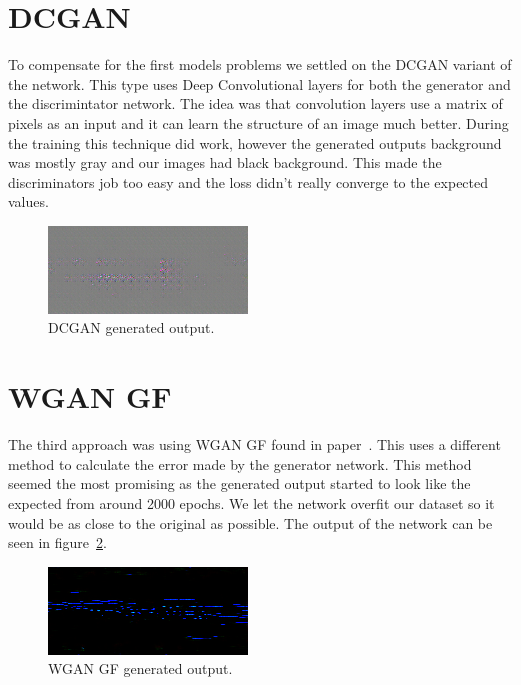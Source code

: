 \documentclass{article}
\begin{document}
\section{DCGAN}
To compensate for the first models problems we settled on the DCGAN variant of the network. This type uses Deep Convolutional layers for both the generator and the discrimintator network. The idea was that convolution layers use a matrix of pixels as an input and it can learn the structure of an image much better. During the training this technique did work, however the generated outputs background was mostly gray and our images had black background. This made the discriminators job too easy and the loss didn't really converge to the expected values.
\begin{figure}[!htb]
	\centering
	\includegraphics[width=\linewidth]{dcgan.png}
	\caption{DCGAN generated output.}
	\label{fig:dcgan}
\end{figure}
\section{WGAN GF}
The third approach was using WGAN GF found in paper~\cite{}. This uses a different method to calculate the error made by the generator network. This method seemed the most promising as the generated output started to look like the expected from around 2000 epochs. We let the network overfit our dataset so it would be as close to the original as possible. The output of the network can be seen in figure~\ref{fig:wgangf}.
\begin{figure}[!htb]
	\centering
	\includegraphics[width=\linewidth]{wgangf.png}
	\caption{WGAN GF generated output.}
	\label{fig:wgangf}
\end{figure}
\end{document}
